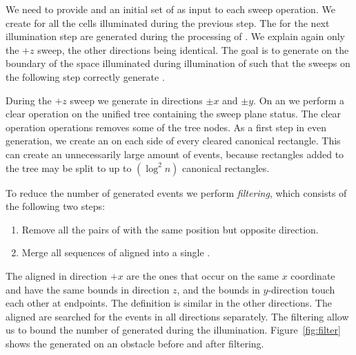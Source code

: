 \documentclass[english,gradu]{tktltiki2018}
\begin{document}
We need to provide \addEs and an initial set of \cellEs as input to each sweep operation.
We create \cellEs for all the cells illuminated during the previous step.
The \addEs for the next illumination step are generated during the processing of \obsEs.
We explain again only the $+z$ sweep, the other directions being identical.
The goal is to generate \addEs on the boundary of the space illuminated during illumination of  such that the sweeps on the following step correctly generate .

During the $+z$ sweep we generate \addEs in directions $\pm x$ and $\pm y$.
On an \obsE we perform a clear operation on the unified tree containing the sweep plane status.
The clear operation operations removes some of the tree nodes.
As a first step in even generation, we create an \addE on each side of every cleared canonical rectangle.
This can create an unnecessarily large amount of events, because rectangles added to the tree may be split to up to $(\log^2 n)$ canonical rectangles.

To reduce the number of generated events we perform \emph{filtering}, which consists of the following two steps:
\begin{enumerate}
\item Remove all the pairs of \addEs with the same position but opposite direction.
\item Merge all sequences of aligned \addEs into a single \addE.
\end{enumerate}

The aligned \addEs in direction $+x$ are the ones that occur on the same $x$ coordinate and have the same bounds in direction $z$, and the bounds in $y$-direction touch each other at endpoints.
The definition is similar in the other directions.
The aligned \addEs are searched for the events in all directions separately.
The filtering allow us to bound the number of \addEs generated during the illumination.
Figure~\ref{fig:filter} shows the generated \addEs on an obstacle before and after filtering.
\end{document}
